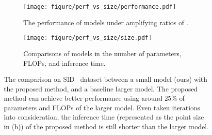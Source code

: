 \documentclass[10pt,twocolumn,letterpaper]{article}
\begin{document}
\begin{figure}[htbp]
    \centering
    \begin{subfigure}{0.48\linewidth}
    \texttt{[image: figure/perf\_vs\_size/performance.pdf]}
    \vspace{-0.35cm}
    \caption{The performance of models under amplifying ratios of .}
    \end{subfigure}
    \hspace{0.1cm}
    \begin{subfigure}{0.48\linewidth}
    \texttt{[image: figure/perf\_vs\_size/size.pdf]}
    \vspace{-0.55cm}
    \caption{Comparisons of models in the number of parameters, FLOPs, and inference time.}
    \end{subfigure}
    \vspace{-0.7cm}
    \caption{The comparison on SID~\cite{chen2018learning} dataset between a small model (ours) with the proposed method, and a baseline larger model. The proposed method can achieve better performance using around 25\% of parameters and FLOPs of the larger model. Even taken iterations into consideration, the inference time (represented as the point size in (b)) of the proposed method is still shorter than the larger model.}
    \label{fig:perf_vs_size}
    \vspace{-0.1cm}
\end{figure}

\begin{table}[htbp]
    \centering
    \vspace{-0.3cm}
    \caption{Quantitative results on Sony subset of SID.}
    \label{tab:sid}
    \vspace{-0.1cm}
\end{table}
\end{document}
